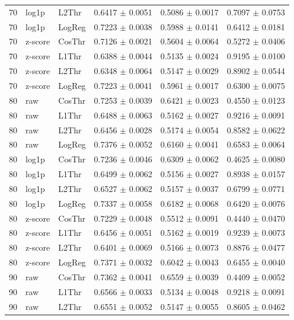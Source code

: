 \begin{longtable}{rllccc}
70 & log1p & L2Thr & 0.6417 $\pm$ 0.0051 & 0.5086 $\pm$ 0.0017 & 0.7097 $\pm$ 0.0753 \\
70 & log1p & LogReg & 0.7223 $\pm$ 0.0038 & 0.5988 $\pm$ 0.0141 & 0.6412 $\pm$ 0.0181 \\
70 & z-score & CosThr & 0.7126 $\pm$ 0.0021 & 0.5604 $\pm$ 0.0064 & 0.5272 $\pm$ 0.0406 \\
70 & z-score & L1Thr & 0.6388 $\pm$ 0.0044 & 0.5135 $\pm$ 0.0024 & 0.9195 $\pm$ 0.0100 \\
70 & z-score & L2Thr & 0.6348 $\pm$ 0.0064 & 0.5147 $\pm$ 0.0029 & 0.8902 $\pm$ 0.0544 \\
70 & z-score & LogReg & 0.7223 $\pm$ 0.0041 & 0.5961 $\pm$ 0.0017 & 0.6300 $\pm$ 0.0075 \\
80 & raw & CosThr & 0.7253 $\pm$ 0.0039 & 0.6421 $\pm$ 0.0023 & 0.4550 $\pm$ 0.0123 \\
80 & raw & L1Thr & 0.6488 $\pm$ 0.0063 & 0.5162 $\pm$ 0.0027 & 0.9216 $\pm$ 0.0091 \\
80 & raw & L2Thr & 0.6456 $\pm$ 0.0028 & 0.5174 $\pm$ 0.0054 & 0.8582 $\pm$ 0.0622 \\
80 & raw & LogReg & 0.7376 $\pm$ 0.0052 & 0.6160 $\pm$ 0.0041 & 0.6583 $\pm$ 0.0064 \\
80 & log1p & CosThr & 0.7236 $\pm$ 0.0046 & 0.6309 $\pm$ 0.0062 & 0.4625 $\pm$ 0.0080 \\
80 & log1p & L1Thr & 0.6499 $\pm$ 0.0062 & 0.5156 $\pm$ 0.0027 & 0.8938 $\pm$ 0.0157 \\
80 & log1p & L2Thr & 0.6527 $\pm$ 0.0062 & 0.5157 $\pm$ 0.0037 & 0.6799 $\pm$ 0.0771 \\
80 & log1p & LogReg & 0.7337 $\pm$ 0.0058 & 0.6182 $\pm$ 0.0068 & 0.6420 $\pm$ 0.0076 \\
80 & z-score & CosThr & 0.7229 $\pm$ 0.0048 & 0.5512 $\pm$ 0.0091 & 0.4440 $\pm$ 0.0470 \\
80 & z-score & L1Thr & 0.6456 $\pm$ 0.0051 & 0.5162 $\pm$ 0.0019 & 0.9239 $\pm$ 0.0073 \\
80 & z-score & L2Thr & 0.6401 $\pm$ 0.0069 & 0.5166 $\pm$ 0.0073 & 0.8876 $\pm$ 0.0477 \\
80 & z-score & LogReg & 0.7371 $\pm$ 0.0032 & 0.6042 $\pm$ 0.0043 & 0.6455 $\pm$ 0.0040 \\
90 & raw & CosThr & 0.7362 $\pm$ 0.0041 & 0.6559 $\pm$ 0.0039 & 0.4409 $\pm$ 0.0052 \\
90 & raw & L1Thr & 0.6566 $\pm$ 0.0033 & 0.5134 $\pm$ 0.0048 & 0.9218 $\pm$ 0.0091 \\
90 & raw & L2Thr & 0.6551 $\pm$ 0.0052 & 0.5147 $\pm$ 0.0055 & 0.8605 $\pm$ 0.0462 \\

\end{longtable}
